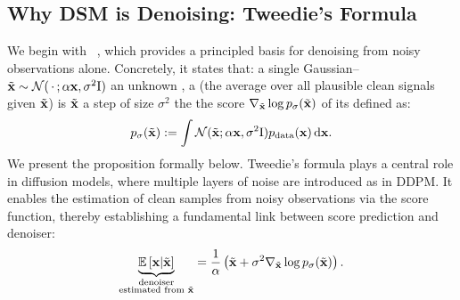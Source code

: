 \subsection{Why DSM is Denoising: Tweedie's Formula}\label{subsec:why-dsm-denoising-tweedie}

We begin with ~\citep{efron2011tweedie}, which provides a principled basis for denoising from noisy observations alone.
Concretely, it states that:  a single Gaussian– $\tilde{{\mathbf{x}}}\sim\mathcal N(\,\cdot\,;\alpha{\mathbf{x}},\sigma^2\mathrm{I})$   an unknown , a  (the
average over all plausible clean signals given $\tilde{{\mathbf{x}}}$) is 
$\tilde{{\mathbf{x}}}$ a step of size $\sigma^2$  the  the score
$\nabla_{\tilde{{\mathbf{x}}}}\log p_\sigma(\tilde{{\mathbf{x}}})$ of its  defined as:
\[
p_\sigma(\tilde{{\mathbf{x}}}):= \int \mathcal{N}(\tilde{{\mathbf{x}}};\alpha {\mathbf{x}},\sigma^2\mathrm{I})p_{\mathrm{data}}({\mathbf{x}})\mathop{}\!\mathrm{d}{\mathbf{x}}.
\]
We present the proposition formally below.
Tweedie’s formula plays a central role in diffusion models, where multiple layers of noise are introduced as in DDPM. 
It enables the estimation of clean samples from noisy observations via the score function, thereby establishing a fundamental link between score prediction and denoiser:
\begin{equation*}
\underbrace{\mathbb{E} \left[{\mathbf{x}}|\tilde{{\mathbf{x}}}\right]}_{\substack{\text{denoiser}\\\text{estimated from }\tilde{{\mathbf{x}}}}}
= \frac{1}{\alpha}\left(\tilde{{\mathbf{x}}} + \sigma^2 \nabla_{\tilde{{\mathbf{x}}}} \log p_\sigma(\tilde{{\mathbf{x}}})\right).
\end{equation*}

